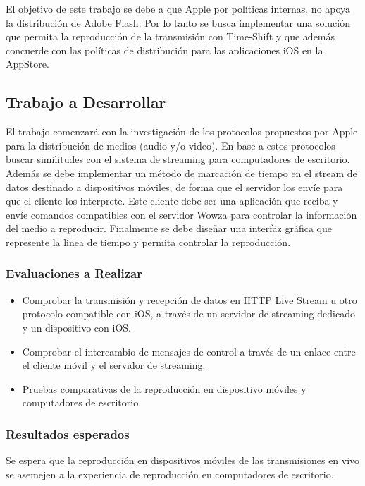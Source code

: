 El objetivo de este trabajo se debe a que Apple por políticas internas, no apoya la distribuci\'on de Adobe Flash. Por lo tanto se busca implementar una soluci\'on que permita la reproducci\'on de la transmisi\'on con Time-Shift y que adem\'as concuerde con las pol\'iticas de distribuci\'on para las aplicaciones iOS en la AppStore.
 
\large
\subsection*{Trabajo a Desarrollar}
\normalsize
El trabajo comenzar\'a con la investigaci\'on de los protocolos propuestos por Apple para la distribuci\'on de medios (audio y/o video). En base a estos protocolos buscar similitudes con el sistema de streaming para computadores de escritorio. Adem\'as se debe implementar un m\'etodo de marcaci\'on de tiempo en el stream de datos destinado a dispositivos m\'oviles, de forma que el servidor los env\'ie para que el cliente los interprete. Este cliente debe ser una aplicaci\'on que reciba y env\'ie comandos compatibles con el servidor Wowza para controlar la informaci\'on del medio a reproducir. Finalmente se debe dise\~nar una interfaz gr\'afica que represente la linea de tiempo y permita controlar la reproducción.\\

\subsubsection*{Evaluaciones a Realizar}
\normalsize
\begin{itemize}
\item	Comprobar la transmisión y recepción de datos en HTTP Live Stream u otro protocolo compatible con iOS, a través de un servidor de streaming dedicado y un dispositivo con iOS.
\item	Comprobar el intercambio de mensajes de control a través de un enlace entre el cliente móvil y el servidor de streaming.
\item	Pruebas comparativas de la reproducción en dispositivo móviles y computadores de escritorio.
\end{itemize}

\subsubsection*{Resultados esperados}
\normalsize
Se espera que la reproducción en dispositivos móviles de las transmisiones en vivo se asemejen a la experiencia de reproducción en computadores de escritorio.\\

